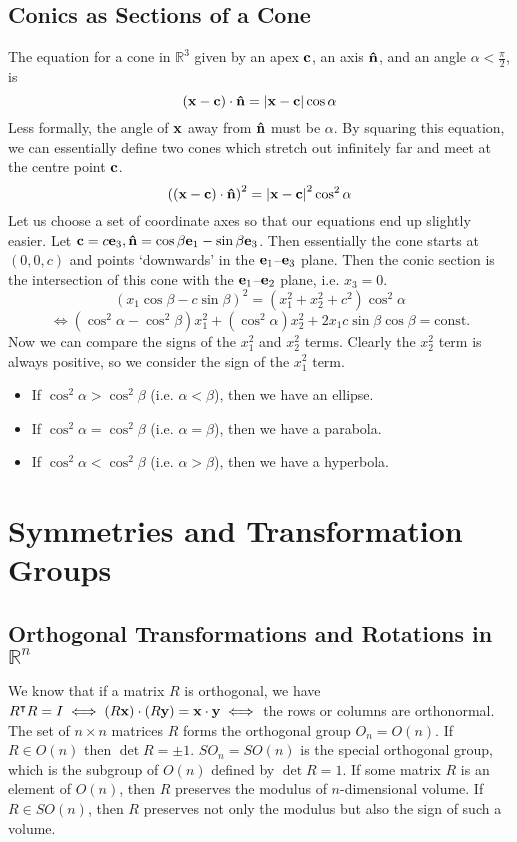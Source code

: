 \documentclass{article}
\begin{document}
\subsection{Conics as Sections of a Cone}
The equation for a cone in $\mathbb R^3$ given by an apex $\vb c$, an axis $\vu n$, and an angle $\alpha < \frac{\pi}{2}$, is
\[ (\vb x - \vb c)\cdot\vu n = \abs{\vb x - \vb c}\cos \alpha \]
Less formally, the angle of $\vb x$ away from $\vu n$ must be $\alpha$. By squaring this equation, we can essentially define two cones which stretch out infinitely far and meet at the centre point $\vb c$.
\[ \left( (\vb x - \vb c)\cdot\vu n \right)^2 = \abs{\vb x - \vb c}^2\cos^2 \alpha \]
Let us choose a set of coordinate axes so that our equations end up slightly easier. Let $\vb c = c\vb e_3, \vu n = \cos\beta \vb e_1 - \sin\beta \vb e_3$. Then essentially the cone starts at $(0, 0, c)$ and points `downwards' in the $\vb e_1$--$\vb e_3$ plane. Then the conic section is the intersection of this cone with the $\vb e_1$--$\vb e_2$ plane, i.e. $x_3 = 0$.
\[ (x_1\cos\beta - c\sin\beta)^2 = (x_1^2 + x_2^2 + c^2)\cos^2\alpha \]
\[ \iff (\cos^2\alpha - \cos^2\beta)x_1^2 + (\cos^2\alpha)x_2^2 + 2x_1c\sin\beta\cos\beta = \text{const.} \]
Now we can compare the signs of the $x_1^2$ and $x_2^2$ terms. Clearly the $x_2^2$ term is always positive, so we consider the sign of the $x_1^2$ term.
\begin{itemize}
	\item If $\cos^2 \alpha > \cos^2\beta$ (i.e. $\alpha < \beta$), then we have an ellipse.
	\item If $\cos^2 \alpha = \cos^2\beta$ (i.e. $\alpha = \beta$), then we have a parabola.
	\item If $\cos^2 \alpha < \cos^2\beta$ (i.e. $\alpha > \beta$), then we have a hyperbola.
\end{itemize}

\section{Symmetries and Transformation Groups}
\subsection{Orthogonal Transformations and Rotations in $\mathbb R^n$}
We know that if a matrix $R$ is orthogonal, we have $R^\intercal R = I \iff (R\vb x) \cdot (R\vb y) = \vb x \cdot \vb y \iff$ the rows or columns are orthonormal. The set of $n \times n$ matrices $R$ forms the orthogonal group $O_n = O(n)$. If $R \in O(n)$ then $\det R = \pm 1$. $SO_n = SO(n)$ is the special orthogonal group, which is the subgroup of $O(n)$ defined by $\det R = 1$. If some matrix $R$ is an element of $O(n)$, then $R$ preserves the modulus of $n$-dimensional volume. If $R \in SO(n)$, then $R$ preserves not only the modulus but also the sign of such a volume.
\end{document}
